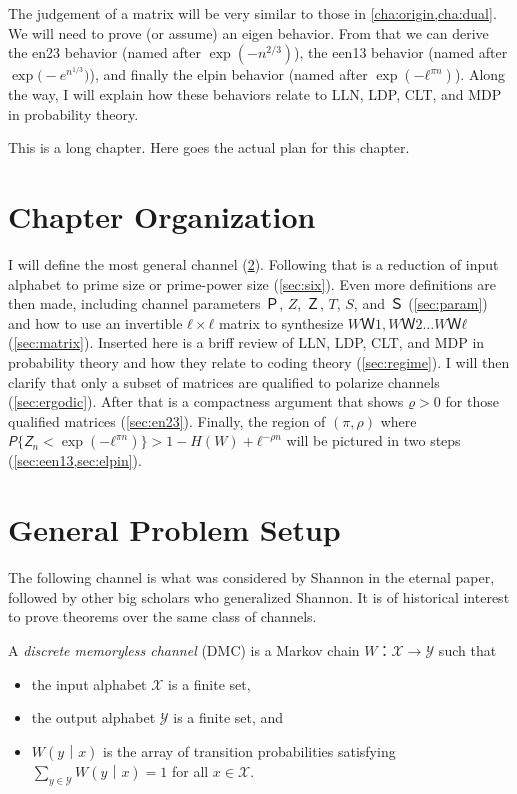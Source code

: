 \documentclass[openany]{amsbook}
\makeatletter
\numberwithin{equation}{chapter}
\numberwithin{figure}{chapter}
\numberwithin{table}{chapter}
\def\bigl@C#1{\bigl#1}					\def\bigr@C#1{\bigr#1}
\def\({\bigl@C(}	\def\){\bigr@C)}	令（{\Bigl(}			令）{\Bigr)}
\theoremstyle{definition}	理dfn:Definition~?s			理exa:Example~?s
\theoremstyle{remark}		理cla:Claim~?s				理rem:Remark~?s
\makeatother
\begin{document}
	The judgement of a matrix will be
	very similar to those in \cref{cha:origin,cha:dual}.
	We will need to prove (or assume) an eigen behavior.
	From that we can derive the en23 behavior (named after $\exp(-n^{2/3})$),
	the een13 behavior (named after $\exp\(-e^{n^{1/3}}\)$),
	and finally the elpin behavior (named after $\exp(-ℓ^{πn})$).
	Along the way, I will explain how these behaviors relate to
	LLN, LDP, CLT, and MDP in probability theory.
	
	This is a long chapter.
	Here goes the actual plan for this chapter.

\section{Chapter Organization}

	I will define the most general channel (\cref{sec:setup}).
	Following that is a reduction of input alphabet
	to prime size or prime-power size (\cref{sec:six}).
	Even more definitions are then made, including channel parameters
	$Ｐ$, $Z$, $Ｚ$, $T$, $S$, and $Ｓ$ (\cref{sec:param}) and how to use
	an invertible $ℓ×ℓ$ matrix to synthesize $WＷ1,WＷ2…WＷ{ℓ}$ (\cref{sec:matrix}).
	Inserted here is a briff review of LLN, LDP, CLT, and MDP in probability theory
	and how they relate to coding theory (\cref{sec:regime}).
	I will then clarify that only a subset of matrices are
	qualified to polarize channels (\cref{sec:ergodic}).
	After that is a compactness argument that shows
	$ϱ>0$ for those qualified matrices (\cref{sec:en23}).
	Finally, the region of $(π,ρ)$ where $𝘗\{𝘡_n<\exp(-ℓ^{πn})\}>1-H(W)+ℓ^{-ρn}$
	will be pictured in two steps (\cref{sec:een13,sec:elpin}).

\section{General Problem Setup}\label{sec:setup}

	The following channel is what was considered by Shannon in the eternal paper,
	followed by other big scholars who generalized Shannon.
	It is of historical interest to prove theorems over the same class of channels.
	
	\begin{dfn}
		A \emph{discrete memoryless channel} (DMC) is a Markov chain $W：𝒳→𝒴$ such that
		\begin{itemize}
			\item	the input alphabet $𝒳$ is a finite set,
			\item	the output alphabet $𝒴$ is a finite set, and
			\item	$W(y｜x)$ is the array of transition probabilities satisfying	\\
					$∑_{y∈𝒴}W(y｜x)=1$ for all $x∈𝒳$.
		\end{itemize}
	\end{dfn}
	
\end{document}
